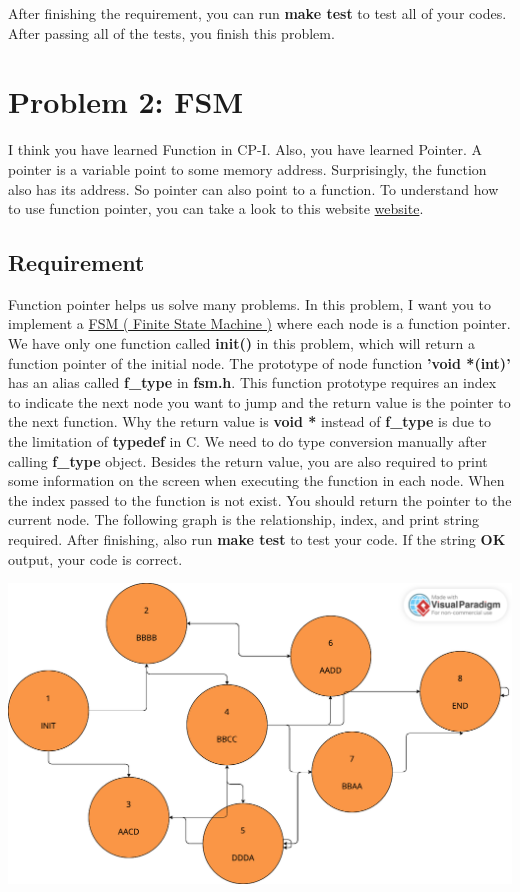 \documentclass{report}
\begin{document}
After finishing the requirement, you can run \textbf{make test} to test all of
your codes.
After passing all of the tests, you finish this problem.

\section{Problem 2: FSM}

I think you have learned Function in CP-I. Also, you have learned Pointer. A
pointer is a variable point to some memory address.
Surprisingly, the function also has its address. So pointer can also point to a
function.
To understand how to use function pointer, you can take a look to this website
\href{https://chenhh.gitbooks.io/parallel_processing/content/cython/function_pointer.html}{website}.

\subsection{Requirement}

Function pointer helps us solve many problems. In this problem, I want you to implement a
\href{https://zh.wikipedia.org/zh-tw/%E6%9C%89%E9%99%90%E7%8A%B6%E6%80%81%E6%9C%BA}{FSM
  ( Finite State Machine )} where each node is a function pointer.
We have only one function called \textbf{init()} in this problem, which will
return a function pointer of the initial node. The prototype of node function 
\textbf{'void *(int)'} has an alias called \textbf{f\_type} in
\textbf{fsm.h}. This function prototype requires an index to indicate the next
node you want to jump and the return
value is the pointer to the next function. Why the return value is \textbf{void *}
instead of \textbf{f\_type} is due to the limitation of \textbf{typedef} in C.
We need to do type conversion manually after calling \textbf{f\_type} object.
Besides the return value, you are also required to print some information on the
screen when executing the function in each node. When the index passed to the
function is not exist. You should return the pointer to the current node.
The following graph is the relationship, index, and print string required. After
finishing, also run \textbf{make test} to test your code. If the string \textbf{OK} output,
your code is correct.


\includegraphics[scale=0.23]{graph}
\end{document}
